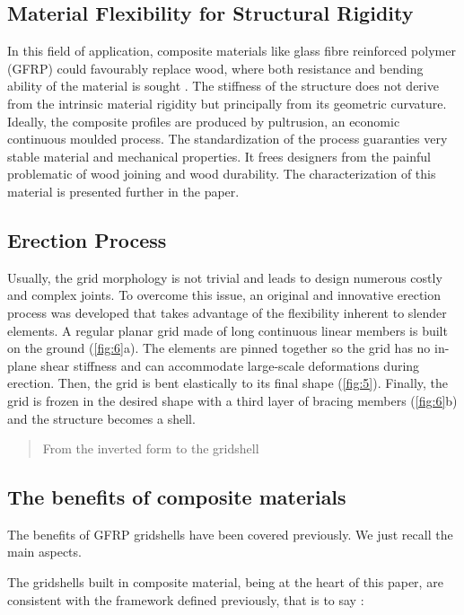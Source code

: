 \subsection{Material Flexibility for Structural Rigidity}
In this field of application, composite materials like glass fibre reinforced polymer (GFRP) could favourably replace wood, where both resistance and bending ability of the material is sought \cite{Douthe2010a}. The stiffness of the structure does not derive from the intrinsic material rigidity but principally from its geometric curvature. Ideally, the composite profiles are produced by pultrusion, an economic continuous moulded process. The standardization of the process guaranties very stable material and mechanical properties. It frees designers from the painful problematic of wood joining and wood durability. The characterization of this material is presented further in the paper.

\subsection{Erection Process}
Usually, the grid morphology is not trivial and leads to design numerous costly and complex joints. To overcome this issue, an original and innovative erection process was developed that takes advantage of the flexibility inherent to slender elements. A regular planar grid made of long continuous linear members is built on the ground (\autoref{fig:6}a). The elements are pinned together so the grid has no in-plane shear stiffness and can accommodate large-scale deformations during erection. Then, the grid is bent elastically to its final shape (\autoref{fig:5}). Finally, the grid is frozen in the desired shape with a third layer of bracing members (\autoref{fig:6}b) and the structure becomes a shell.

\blockcquote[][p.~179]{IL10}{From the inverted form to the gridshell}

\subsection{The benefits of composite materials}

The benefits of GFRP gridshells have been covered previously. We just recall the main aspects.

The gridshells built in composite material, being at the heart of this paper, are consistent with the framework defined previously, that is to say :


